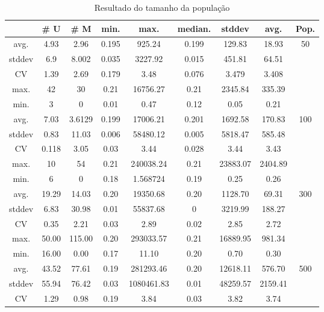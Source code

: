\documentclass[a4paper]{article}
\begin{document}
\noindent
\begin{table}[h!]
  \center
  \caption{Resultado do tamanho da população}
  \label{tbl:result_pop}
  \begin{tabular}{| c | c | c | c | c | c | c | c | c |}
    \hline
    &  \# U & \# M & min. & max. & median. & stddev & avg. & Pop. \\ \hline \hline
    avg. & 4.93 & 2.96 & 0.195 & 925.24 & 0.199 & 129.83 & 18.93 &  \multirow{5}{1.5cm}{50} \\ \cline{1-8}
    stddev & 6.9 & 8.002 & 0.035 & 3227.92 & 0.015 & 451.81 & 64.51 & \\ \cline{1-8}
    CV & 1.39 & 2.69 & 0.179 & 3.48 & 0.076 & 3.479 & 3.408 & \\ \cline{1-8}
    max. & 42 & 30 & 0.21 & 16756.27 & 0.21 & 2345.84 & 335.39 & \\ \cline{1-8}
    min. & 3 & 0 & 0.01 & 0.47 & 0.12 & 0.05 & 0.21 & \\ \hline \hline
    avg. & 7.03 & 3.6129 & 0.199 & 17006.21 & 0.201 & 1692.58 & 170.83 & \multirow{5}{1.5cm}{100} \\ \cline{1-8}
    stddev & 0.83 & 11.03 & 0.006 & 58480.12 & 0.005 & 5818.47 & 585.48 & \\ \cline{1-8}
    CV & 0.118 & 3.05 & 0.03 & 3.44 & 0.028 & 3.44 & 3.43 & \\ \cline{1-8}
    max. & 10 & 54 & 0.21 & 240038.24 & 0.21 & 23883.07 & 2404.89  & \\ \cline{1-8}
    min. & 6 & 0 & 0.18 & 1.568724 & 0.19 & 0.25 & 0.26 & \\ \hline \hline
    avg. & 19.29 & 14.03 & 0.20 & 19350.68 & 0.20 & 1128.70 & 69.31 & \multirow{5}{1.5cm}{300} \\ \cline{1-8}
    stddev & 6.83 & 30.98 & 0.01 & 55837.68 & 0 & 3219.99 & 188.27 & \\ \cline{1-8}
    CV & 0.35 & 2.21 & 0.03 & 2.89 & 0.02 & 2.85 & 2.72 & \\ \cline{1-8}
    max. & 50.00 & 115.00 & 0.20 & 293033.57 & 0.21 & 16889.95 & 981.34 & \\ \cline{1-8}
    min. & 16.00 & 0.00 & 0.17 & 11.10 & 0.20 & 0.70 & 0.30 & \\ \hline \hline
    avg. & 43.52 & 77.61 & 0.19 & 281293.46 & 0.20 & 12618.11 & 576.70 & \multirow{5}{1.5cm}{500} \\ \cline{1-8}
    stddev & 55.94 & 76.42 & 0.03 & 1080461.83 & 0.01 & 48259.57 & 2159.41 & \\ \cline{1-8}
    CV & 1.29 & 0.98 & 0.19 & 3.84 & 0.03 & 3.82 & 3.74 & \\ \cline{1-8}

\end{tabular}
\end{table}
\end{document}
